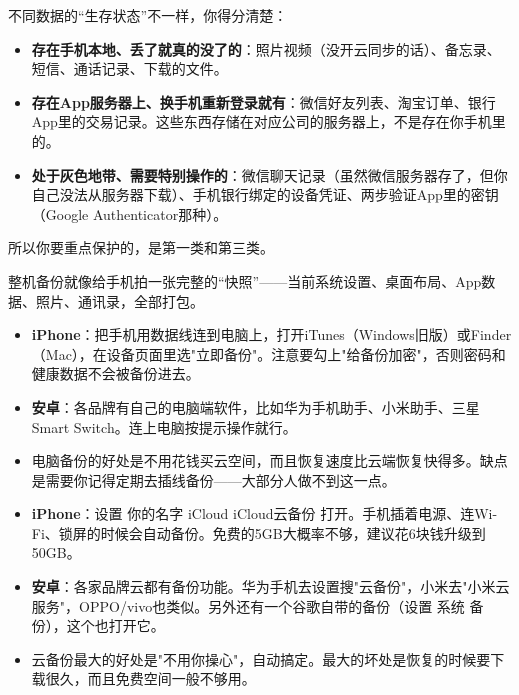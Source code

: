 


不同数据的“生存状态”不一样，你得分清楚：

\begin{itemize}
  \item \textbf{存在手机本地、丢了就真的没了的}：照片视频（没开云同步的话）、备忘录、短信、通话记录、下载的文件。
  \item \textbf{存在App服务器上、换手机重新登录就有}：微信好友列表、淘宝订单、银行App里的交易记录。这些东西存储在对应公司的服务器上，不是存在你手机里的。
  \item \textbf{处于灰色地带、需要特别操作的}：微信聊天记录（虽然微信服务器存了，但你自己没法从服务器下载）、手机银行绑定的设备凭证、两步验证App里的密钥（Google Authenticator那种）。
\end{itemize}

所以你要重点保护的，是第一类和第三类。


整机备份就像给手机拍一张完整的“快照”——当前系统设置、桌面布局、App数据、照片、通讯录，全部打包。


\begin{itemize}
  \item \textbf{iPhone}：把手机用数据线连到电脑上，打开iTunes（Windows旧版）或Finder（Mac），在设备页面里选"立即备份"。注意要勾上"给备份加密"，否则密码和健康数据不会被备份进去。
  \item \textbf{安卓}：各品牌有自己的电脑端软件，比如华为手机助手、小米助手、三星Smart Switch。连上电脑按提示操作就行。
  \item 电脑备份的好处是不用花钱买云空间，而且恢复速度比云端恢复快得多。缺点是需要你记得定期去插线备份——大部分人做不到这一点。
\end{itemize}


\begin{itemize}
  \item \textbf{iPhone}：设置 你的名字 iCloud iCloud云备份 打开。手机插着电源、连Wi-Fi、锁屏的时候会自动备份。免费的5GB大概率不够，建议花6块钱升级到50GB。
  \item \textbf{安卓}：各家品牌云都有备份功能。华为手机去设置搜"云备份"，小米去"小米云服务"，OPPO/vivo也类似。另外还有一个谷歌自带的备份（设置 系统 备份），这个也打开它。
  \item 云备份最大的好处是"不用你操心"，自动搞定。最大的坏处是恢复的时候要下载很久，而且免费空间一般不够用。
\end{itemize}

